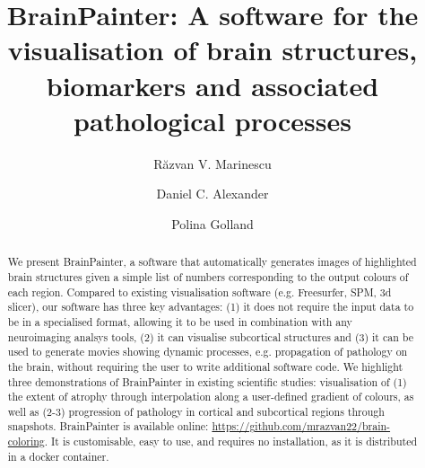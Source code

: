 \documentclass[final,times,twocolumn,authoryear]{elsarticle}
\begin{document}
\begin{frontmatter}

\title{BrainPainter: A software for the visualisation of brain structures, biomarkers and associated pathological processes}


\address[mit]{Computer Science and Artificial Intelligence Laboratory, Massachusetts Institute of Technology, Cambridge, USA, MA 02139}
\address[ucl]{Centre for Medical Image Computing, University College London, Gower Street, London, United Kingdom, WC1E 6BT
\frontFig
}

\author[mit,ucl]{R\u{a}zvan V. Marinescu}
\author[ucl]{Daniel C. Alexander}
\author[mit]{Polina Golland}

\begin{abstract}
We present BrainPainter, a software that automatically generates images of highlighted brain structures given a simple list of numbers corresponding to the output colours of each region. Compared to existing visualisation software (e.g. Freesurfer, SPM, 3d slicer), our software has three key advantages: (1) it does not require the input data to be in a specialised format, allowing it to be used in combination with any neuroimaging analsys tools, (2) it can visualise subcortical structures and (3) it can be used to generate movies showing dynamic processes, e.g. propagation of pathology on the brain, without requiring the user to write additional software code. We highlight three demonstrations of BrainPainter in existing scientific studies: visualisation of (1) the extent of atrophy through interpolation along a user-defined gradient of colours, as well as (2-3) progression of pathology in cortical and subcortical regions through snapshots. BrainPainter is available online: \url{https://github.com/mrazvan22/brain-coloring}. It is customisable, easy to use, and requires no installation, as it is distributed in a docker container.
\end{abstract}


\end{frontmatter}


\end{document}
